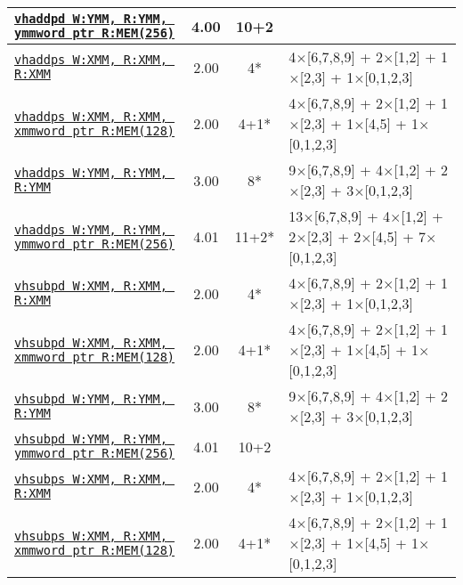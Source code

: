 \documentclass[a4paper,english,fontsize=9]{scrartcl}
\begin{document}
\begin{longtable}{p{}ccL{.25\textwidth}}
  \midrule
  \texttt{\href{https://felixcloutier.com/x86/HADDPD.html}{vhaddpd W:YMM, R:YMM, ymmword ptr R:MEM(256)}} & 4.00 & 10+2 &  \\
  \midrule
  \texttt{\href{https://felixcloutier.com/x86/HADDPS.html}{vhaddps W:XMM, R:XMM, R:XMM}} & 2.00 & 4* & 4\(\times\)[6,7,8,9] + 2\(\times\)[1,2] + 1\(\times\)[2,3] + 1\(\times\)[0,1,2,3] \\
  \midrule
  \texttt{\href{https://felixcloutier.com/x86/HADDPS.html}{vhaddps W:XMM, R:XMM, xmmword ptr R:MEM(128)}} & 2.00 & 4+1* & 4\(\times\)[6,7,8,9] + 2\(\times\)[1,2] + 1\(\times\)[2,3] + 1\(\times\)[4,5] + 1\(\times\)[0,1,2,3] \\
  \midrule
  \texttt{\href{https://felixcloutier.com/x86/HADDPS.html}{vhaddps W:YMM, R:YMM, R:YMM}} & 3.00 & 8* & 9\(\times\)[6,7,8,9] + 4\(\times\)[1,2] + 2\(\times\)[2,3] + 3\(\times\)[0,1,2,3] \\
  \midrule
  \texttt{\href{https://felixcloutier.com/x86/HADDPS.html}{vhaddps W:YMM, R:YMM, ymmword ptr R:MEM(256)}} & 4.01 & 11+2* & 13\(\times\)[6,7,8,9] + 4\(\times\)[1,2] + 2\(\times\)[2,3] + 2\(\times\)[4,5] + 7\(\times\)[0,1,2,3] \\
  \midrule
  \texttt{\href{https://felixcloutier.com/x86/HSUBPD.html}{vhsubpd W:XMM, R:XMM, R:XMM}} & 2.00 & 4* & 4\(\times\)[6,7,8,9] + 2\(\times\)[1,2] + 1\(\times\)[2,3] + 1\(\times\)[0,1,2,3] \\
  \midrule
  \texttt{\href{https://felixcloutier.com/x86/HSUBPD.html}{vhsubpd W:XMM, R:XMM, xmmword ptr R:MEM(128)}} & 2.00 & 4+1* & 4\(\times\)[6,7,8,9] + 2\(\times\)[1,2] + 1\(\times\)[2,3] + 1\(\times\)[4,5] + 1\(\times\)[0,1,2,3] \\
  \midrule
  \texttt{\href{https://felixcloutier.com/x86/HSUBPD.html}{vhsubpd W:YMM, R:YMM, R:YMM}} & 3.00 & 8* & 9\(\times\)[6,7,8,9] + 4\(\times\)[1,2] + 2\(\times\)[2,3] + 3\(\times\)[0,1,2,3] \\
  \midrule
  \texttt{\href{https://felixcloutier.com/x86/HSUBPD.html}{vhsubpd W:YMM, R:YMM, ymmword ptr R:MEM(256)}} & 4.01 & 10+2 &  \\
  \midrule
  \texttt{\href{https://felixcloutier.com/x86/HSUBPS.html}{vhsubps W:XMM, R:XMM, R:XMM}} & 2.00 & 4* & 4\(\times\)[6,7,8,9] + 2\(\times\)[1,2] + 1\(\times\)[2,3] + 1\(\times\)[0,1,2,3] \\
  \midrule
  \texttt{\href{https://felixcloutier.com/x86/HSUBPS.html}{vhsubps W:XMM, R:XMM, xmmword ptr R:MEM(128)}} & 2.00 & 4+1* & 4\(\times\)[6,7,8,9] + 2\(\times\)[1,2] + 1\(\times\)[2,3] + 1\(\times\)[4,5] + 1\(\times\)[0,1,2,3] \\

\end{longtable}
\end{document}
